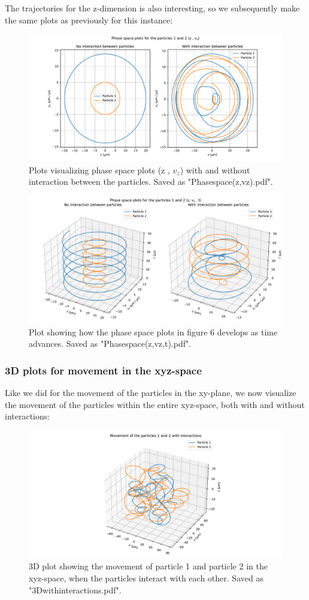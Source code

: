 \documentclass[english,notitlepage,reprint,nofootinbib,twocolumn]{article}
\begin{document}
The trajectories for the z-dimension is also interesting, so we subsequently make the same plots as previously for this instance: 
\begin{figure}[H]
    \centering
    \includegraphics[width = .45\textwidth]{Phasespace_(z,v_z).pdf} 
    \caption{Plots visualizing phase space plots (z , $v_z$) with and without interaction between the particles. Saved as "Phasespace\textunderscore (z,v\textunderscore z).pdf".}
    \label{fig: ee251}
\end{figure} 
\begin{figure}[H]
    \centering
    \includegraphics[width = .45\textwidth]{Phasespace_(z,v_z,t).pdf} 
    \caption{Plot showing how the phase space plots in figure 6 develops as time advances. Saved as "Phasespace\textunderscore (z,v\textunderscore z,t).pdf".}
    \label{fig: ee251}
\end{figure} 
\pagebreak
\subsubsection{3D plots for movement in the xyz-space}
Like we did for the movement of the particles in the xy-plane, we now visualize the movement of the particles within the entire xyz-space, both with and without interactions: 
\begin{figure}[H]
    \centering
    \includegraphics[width = .45\textwidth]{3Dwithinteractions.pdf} 
    \caption{3D plot showing the movement of particle 1 and particle 2 in the xyz-space, when the particles interact with each other. Saved as "3Dwithinteractions.pdf".}
    \label{fig: ee251}
\end{figure} 
\end{document}
